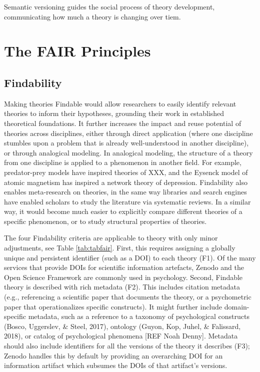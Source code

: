 \documentclass[
  man,floatsintext]{apa6}
\begin{document}
Semantic versioning guides the social process of theory development, communicating how much a theory is changing over tiem.

\section{The FAIR Principles}\label{the-fair-principles}

\subsection{Findability}\label{findability}

Making theories Findable would allow researchers to easily identify relevant theories to inform their hypotheses,
grounding their work in established theoretical foundations.
It further increases the impact and reuse potential of theories across disciplines,
either through direct application (where one discipline stumbles upon a problem that is already well-understood in another discipline),
or through analogical modeling.
In analogical modeling, the structure of a theory from one discipline is applied to a phenomenon in another field.
For example, predator-prey models have inspired theories of XXX, and the Eysenck model of atomic magnetism has inspired a network theory of depression.
Findability also enables meta-research on theories,
in the same way libraries and search engines have enabled scholars to study the literature via systematic reviews.
In a similar way, it would become much easier to explicitly compare different theories of a specific phenomenon,
or to study structural properties of theories.

The four Findability criteria are applicable to theory with only minor adjustments, see Table \ref{tab:tabfair}.
First, this requires assigning a globally unique and persistent identifier (such as a DOI) to each theory (F1).
Of the many services that provide DOIs for scientific information artefacts,
Zenodo and the Open Science Framework are commonly used in psychology.
Second, Findable theory is described with rich metadata (F2).
This includes citation metadata (e.g., referencing a scientific paper that documents the theory, or a psychometric paper that operationalizes specific constructs).
It might further include domain-specific metadata, such as a reference to a taxonomy of psychological constructs (Bosco, Uggerslev, \& Steel, 2017),
ontology (Guyon, Kop, Juhel, \& Falissard, 2018),
or catalog of psychological phenomena {[}REF Noah Denny{]}.
Metadata should also include identifiers for all the versions of the theory it describes (F3);
Zenodo handles this by default by providing an overarching DOI for an information artifact which subsumes the DOIs of that artifact's versions.
\end{document}
